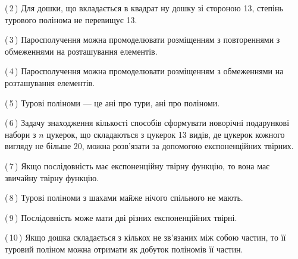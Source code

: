 \documentclass[12pt, ukrainian]{article}
\begin{document}
\begin {large}
\begin {large}
\begin {large}
\begin {large}
\begin {large}
\begin {large}
\begin {large}
\begin {large}
\begin {large}
\begin {large}
\begin {large}
\begin {large}
\begin {large}
\begin {large}
\begin {large}
\begin {large}
\begin {large}
\begin {large}
\begin {large}
\begin {large}
\begin {large}
\begin {large}
\begin {large}
\begin {large}
\begin {large}
\begin {large}
\begin {large}
\begin {large}
\begin {large}
\begin {large}
\begin {large}
\begin {large}
\begin {large}
\begin {large}
\begin {large}
\begin {large}
\begin {large}
\begin {large}
\begin {large}
\begin {large}
\begin {large}
\begin {large}
\begin {large}
\begin {large}
\begin {large}
\begin {large}
\begin {large}
\begin {large}
{(\,2\,) Для дошки, що вкладається в квадрат ну дошку зі стороною 13, степінь турового полінома не перевищує 13.%



(\,3\,) Паросполучення можна промоделювати розміщенням з повтореннями з обмеженнями на розташування елементів.%



(\,4\,) Паросполучення можна промоделювати розміщенням з обмеженнями на розташування елементів.%



(\,5\,) Турові поліноми --- це ані про тури, ані про поліноми.%



(\,6\,) Задачу знаходження кількості способів сформувати новорічні подарункові набори з $n$ цукерок, що складаються з цукерок 13 видів, де цукерок кожного вигляду не більше 20, можна розв’язати за допомогою експоненційних твірних.%



(\,7\,) Якщо послідовність має експоненційну твірну функцію, то вона має звичайну твірну функцію.%



(\,8\,) Турові поліноми з шахами майже нічого спільного не мають.%



(\,9\,) Послідовність може мати дві різних експоненційних твірні.%



(\,10\,) Якщо дошка складається з кількох не зв’язаних між собою частин, то її туровий поліном можна отримати як добуток поліномів її частин.%




\vspace{5mm}
}
\newpage

\begin {large}


\end{large}
\end{large}
\end{large}
\end{large}
\end{large}
\end{large}
\end{large}
\end{large}
\end{large}
\end{large}
\end{large}
\end{large}
\end{large}
\end{large}
\end{large}
\end{large}
\end{large}
\end{large}
\end{large}
\end{large}
\end{large}
\end{large}
\end{large}
\end{large}
\end{large}
\end{large}
\end{large}
\end{large}
\end{large}
\end{large}
\end{large}
\end{large}
\end{large}
\end{large}
\end{large}
\end{large}
\end{large}
\end{large}
\end{large}
\end{large}
\end{large}
\end{large}
\end{large}
\end{large}
\end{large}
\end{large}
\end{large}
\end{large}
\end{large}
\end{document}
